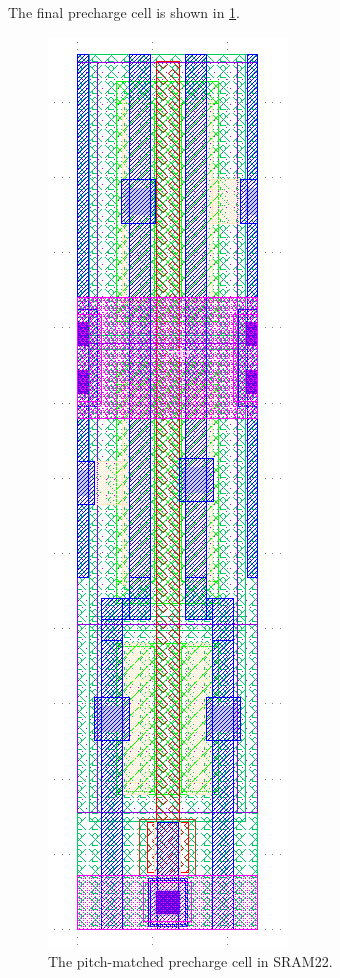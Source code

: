 The final precharge cell is shown in \ref{fig:precharge-final}.

\begin{figure}[H] \centering
\includegraphics[angle=90, width=\textwidth]{figures/precharge_final.png}
\caption{The pitch-matched precharge cell in SRAM22. \label{fig:precharge-final}}
\end{figure}

